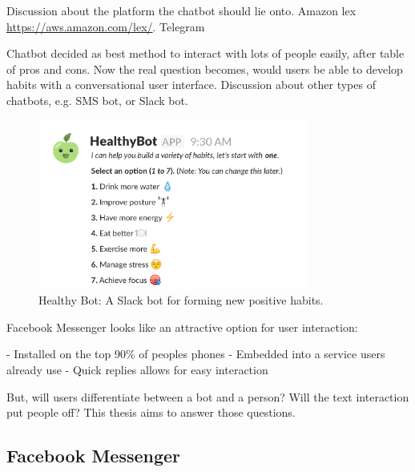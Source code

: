 Discussion about the platform the chatbot should lie onto. Amazon lex \url{https://aws.amazon.com/lex/}. Telegram


Chatbot decided as best method to interact with lots of people easily, after table of pros and cons. Now the real question becomes, would users be able to develop habits with a conversational user interface. Discussion about other types of chatbots, e.g. SMS bot, or Slack bot.

\begin{figure}[H] %
    \centering
    \includegraphics[width=3.5in]{../resources/existing-bots/healthy-bot.png}
    \caption{Healthy Bot: A Slack bot for forming new positive habits.}
    \label{fig:healthy_bot}
\end{figure}

Facebook Messenger looks like an attractive option for user interaction:

- Installed on the top 90\% of peoples phones
- Embedded into a service users already use
- Quick replies allows for easy interaction

But, will users differentiate between a bot and a person? Will the text interaction put people off? This thesis aims to answer those questions.

\subsection{Facebook Messenger}

